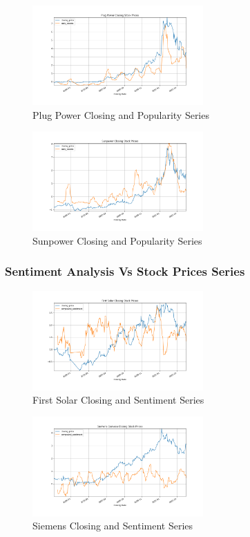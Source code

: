 \documentclass[sigconf, nonacm]{acmart}
\begin{document}
\begin{figure}[H]
  \centering
  \includegraphics[width=\linewidth, height =1.5in]{popularity_time_series/Plug Power Closing Stock Prices_closing_price_daily_tweets.png}
  \caption{Plug Power Closing and Popularity Series}
\end{figure}

\begin{figure}[H]
  \centering
  \includegraphics[width=\linewidth, height =1.5in]{popularity_time_series/Sunpower Closing Stock Prices_closing_price_daily_tweets.png}
  \caption{Sunpower Closing and Popularity Series}
\end{figure}


\subsubsection{Sentiment Analysis  Vs Stock Prices Series} 
\begin{figure}[H]
  \centering
  \includegraphics[width=\linewidth, height =1.5in]{sentiment_time_series/First Solar Closing Stock Prices_closing_price_compound_sentiment.png}
  \caption{First Solar Closing and Sentiment Series}
\end{figure}

\begin{figure}[H]
  \centering
  \includegraphics[width=\linewidth, height =1.5in]{sentiment_time_series/Siemens Gamesa Closing Stock Prices_closing_price_compound_sentiment.png}
  \caption{Siemens Closing and Sentiment Series}
\end{figure}
\end{document}
